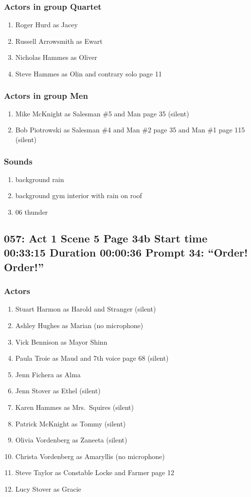\subsubsection{Actors in group Quartet}
\begin{enumerate}
\item Roger Hurd as Jacey
\item Russell Arrowsmith as Ewart
\item Nicholas Hammes as Oliver
\item Steve Hammes as Olin and contrary solo page 11
\end{enumerate}
\subsubsection{Actors in group Men}
\begin{enumerate}
\item Mike McKnight as Salesman \#5 and Man page 35 (silent)
\item Bob Piotrowski as Salesman \#4 and Man \#2 page 35 and Man \#1 page 115 (silent)
\end{enumerate}

\subsubsection{Sounds}
\begin{enumerate}
\item background rain
\item background gym interior with rain on roof
\item 06 thunder
\end{enumerate}
\subsection{057: Act 1 Scene 5 Page 34b Start time 00:33:15 Duration 00:00:36 Prompt 34: ``Order! Order!''}

\subsubsection{Actors}
\begin{enumerate}
\item Stuart Harmon as Harold and Stranger (silent)
\item Ashley Hughes as Marian (no microphone)
\item Vick Bennison as Mayor Shinn
\item Paula Troie as Maud and 7th voice page 68 (silent)
\item Jenn Fichera as Alma
\item Jenn Stover as Ethel (silent)
\item Karen Hammes as Mrs.~Squires (silent)
\item Patrick McKnight as Tommy (silent)
\item Olivia Vordenberg as Zaneeta (silent)
\item Christa Vordenberg as Amaryllis (no microphone)
\item Steve Taylor as Constable Locke and Farmer page 12
\item Lucy Stover as Gracie
\end{enumerate}
